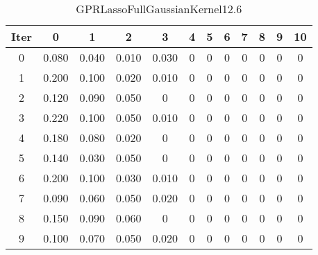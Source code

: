 \begin{table}
	\begin{center}
		\begin{tabular}{|c|c|c|c|c|c|c|c|c|c|c|c|}
			\hline
			Iter & 0 & 1 & 2 & 3 & 4 & 5 & 6 & 7 & 8 & 9 & 10 \\
			\hline
			0 & 0.080 & 0.040 & 0.010 & 0.030 & 0 & 0 & 0 & 0 & 0 & 0 & 0 \\
			\hline
			1 & 0.200 & 0.100 & 0.020 & 0.010 & 0 & 0 & 0 & 0 & 0 & 0 & 0 \\
			\hline
			2 & 0.120 & 0.090 & 0.050 & 0 & 0 & 0 & 0 & 0 & 0 & 0 & 0 \\
			\hline
			3 & 0.220 & 0.100 & 0.050 & 0.010 & 0 & 0 & 0 & 0 & 0 & 0 & 0 \\
			\hline
			4 & 0.180 & 0.080 & 0.020 & 0 & 0 & 0 & 0 & 0 & 0 & 0 & 0 \\
			\hline
			5 & 0.140 & 0.030 & 0.050 & 0 & 0 & 0 & 0 & 0 & 0 & 0 & 0 \\
			\hline
			6 & 0.200 & 0.100 & 0.030 & 0.010 & 0 & 0 & 0 & 0 & 0 & 0 & 0 \\
			\hline
			7 & 0.090 & 0.060 & 0.050 & 0.020 & 0 & 0 & 0 & 0 & 0 & 0 & 0 \\
			\hline
			8 & 0.150 & 0.090 & 0.060 & 0 & 0 & 0 & 0 & 0 & 0 & 0 & 0 \\
			\hline
			9 & 0.100 & 0.070 & 0.050 & 0.020 & 0 & 0 & 0 & 0 & 0 & 0 & 0 \\
			\hline
		\end{tabular}
	\end{center}
	\caption{GPRLassoFullGaussianKernel12.6}
\end{table}